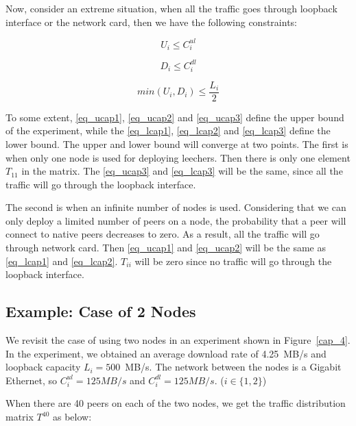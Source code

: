 \documentclass[10pt,letterpaper,twocolumn]{article}
\begin{document}
Now, consider an extreme situation, when all the traffic goes through
loopback interface or the network card, then we have the following
constraints: 

\begin{equation}
U_{i} \leqslant  C_{i}^{ul} \label{eq_lcap1}
\end{equation}

\begin{equation}
D_{i} \leqslant  C_{i}^{dl} \label{eq_lcap2}
\end{equation}

\begin{equation}
min(U_{i}, D_{i}) \leqslant  \frac{L_{i}}{2} \label{eq_lcap3}
\end{equation}


To some extent, \eqref{eq_ucap1}, \eqref{eq_ucap2} and
\eqref{eq_ucap3} define the upper bound of the experiment, while the
\eqref{eq_lcap1}, \eqref{eq_lcap2} and \eqref{eq_lcap3} define the
lower bound. The upper and lower bound will converge at two
points. The first is when only one node is used for deploying
leechers. Then there is only one element $T_{11}$ in the matrix. The
\eqref{eq_ucap3} and \eqref{eq_lcap3} will be the same, since all the
traffic will go through the loopback interface.

The second is when an infinite number of nodes is used. Considering
that we can only deploy a limited number of peers on a node, the
probability that a peer will connect to native peers decreases to
zero. As a result, all the traffic will go through network card. Then
\eqref{eq_ucap1} and \eqref{eq_ucap2} will be the same as
\eqref{eq_lcap1} and \eqref{eq_lcap2}. $T_{ii}$ will be zero since no
traffic will go through the loopback interface.





\subsection{Example: Case of 2 Nodes }
\label{sec:example:-case-2}

We revisit the case of using two nodes in an experiment shown in
Figure~\ref{cap_4}. In the experiment, we obtained an average download
rate of 4.25~MB/s and loopback capacity $L_i = 500 $~MB/s. The network
between the nodes is a Gigabit Ethernet, so $C_{i}^{ul}=125MB/s$ and
$C_{i}^{dl}=125MB/s$. ($i \in \lbrace 1, 2\rbrace$)

When there are 40 peers on each of the two nodes, we get the traffic
distribution matrix $T^{40}$ as below:
\end{document}
